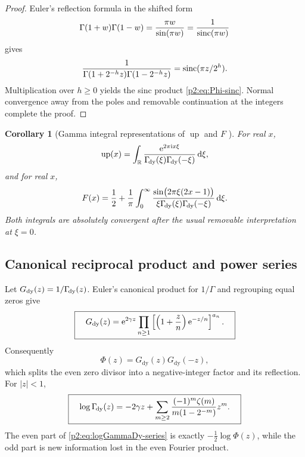 \documentclass[11pt]{article}
\newtheorem{corollary}[theorem]{Corollary}
\theoremstyle{definition}
\theoremstyle{remark}
\newcommand{\R}{\mathbb R}
\newcommand{\dd}{\,\mathrm d}
\newcommand{\Up}{\operatorname{up}}
\begin{document}
\begin{proof}
Euler's reflection formula in the shifted form
\begin{equation}
 \Gamma(1+w)\Gamma(1-w)=\frac{\pi w}{\sin(\pi w)}
 =\frac{1}{\operatorname{sinc}(\pi w)}                                  \label{p2:eq:gamma-reflection}
\end{equation}
gives
\[
 \frac{1}{\Gamma(1+2^{-h}z)\Gamma(1-2^{-h}z)}
 =\operatorname{sinc}(\pi z/2^h).
\]
Multiplication over $h\ge0$ yields the sinc product \eqref{p2:eq:Phi-sinc}.  Normal convergence
away from the poles and removable continuation at the integers complete the proof.
\end{proof}

\begin{corollary}[Gamma integral representations of $\Up$ and $F$ \New]
For real $x$,
\begin{equation}
 \Up(x)=\int_{\R}
 \frac{\e^{2\pi\ii x\xi}}
 {\GammaDy(\xi)\GammaDy(-\xi)}\dd\xi,                    \label{p2:eq:up-GammaDy-integral}
\end{equation}
and for real $x$,
\begin{equation}
 F(x)=\frac12+\frac1\pi\int_0^\infty
 \frac{\sin\bigl(2\pi\xi(2x-1)\bigr)}
 {\xi\GammaDy(\xi)\GammaDy(-\xi)}\dd\xi.              \label{p2:eq:F-GammaDy-integral}
\end{equation}
Both integrals are absolutely convergent after the usual removable interpretation at
$\xi=0$.
\end{corollary}

\subsection{Canonical reciprocal product and power series}

Let $G_{\mathrm{dy}}(z)=1/\Gamma_{\!\mathrm{dy}}(z)$.  Euler's canonical product for $1/\Gamma$ and
regrouping equal zeros give
\begin{equation}
 \boxed{\quad
 G_{\mathrm{dy}}(z)
 =\mathrm e^{2\gamma z}
 \prod_{n\ge1}\left[\left(1+\frac{z}{n}\right)
 \mathrm e^{-z/n}\right]^{a_n}.
 \quad}                                                  \label{p2:eq:Gdy-canonical}
\end{equation}
Consequently
\begin{equation}
 \Phi(z)=G_{\mathrm{dy}}(z)G_{\mathrm{dy}}(-z),          \label{p2:eq:Phi-Gdy}
\end{equation}
which splits the even zero divisor into a negative-integer factor and its reflection.
For $|z|<1$,
\begin{equation}
 \boxed{\quad
 \log\Gamma_{\!\mathrm{dy}}(z)
 =-2\gamma z+
 \sum_{m\ge2}\frac{(-1)^m\zeta(m)}{m(1-2^{-m})}z^m.
 \quad}                                                  \label{p2:eq:logGammaDy-series}
\end{equation}
The even part of \eqref{p2:eq:logGammaDy-series} is exactly
$-\tfrac12\log\Phi(z)$, while the odd part is new information lost in the even Fourier
product.
\end{document}
